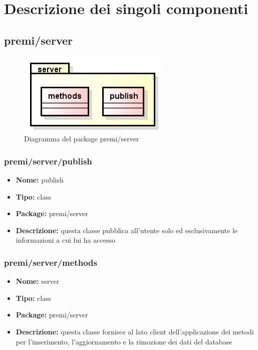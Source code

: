 \section{Descrizione dei singoli componenti}

\subsection{premi/server}
\begin{figure}[H]
\begin{center}
\includegraphics[scale=0.45]{img/diapkg/server.png}
\caption{Diagramma del package premi/server}
\end{center}
\end{figure}

\subsubsection{premi/server/publish}
\begin{itemize}
  \item[] \textbf{Nome:} publish
  \item[] \textbf{Tipo:} class
  \item[] \textbf{Package:} premi/server
  \item[] \textbf{Descrizione:} questa classe pubblica all'utente solo ed esclusivamente le informazioni a cui lui ha accesso
\end{itemize}


\subsubsection{premi/server/methods}
\begin{itemize}
  \item[] \textbf{Nome:} server
  \item[] \textbf{Tipo:} class
  \item[] \textbf{Package:} premi/server
  \item[] \textbf{Descrizione:} questa classe fornisce al lato client dell'applicazione dei metodi per l'inserimento, l'aggiornamento e la rimozione dei dati del database
\end{itemize}





